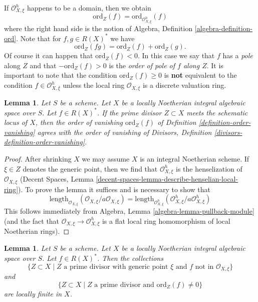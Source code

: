\documentclass{stacks-project}
\theoremstyle{plain}
\newtheorem{lemma}[subsection]{Lemma}
\theoremstyle{definition}
\theoremstyle{remark}
\numberwithin{equation}{subsection}
\begin{document}
\noindent
If $\mathcal{O}_{X, \xi}^h$ happens to be a domain, then we obtain
$$
\text{ord}_Z(f) = \text{ord}_{\mathcal{O}_{X, \xi}^h}(f)
$$
where the right hand side is the notion of
Algebra, Definition \ref{algebra-definition-ord}.
Note that for $f, g \in R(X)^*$ we have
$$
\text{ord}_Z(fg) = \text{ord}_Z(f) + \text{ord}_Z(g).
$$
Of course it can happen that $\text{ord}_Z(f) < 0$.
In this case we say that $f$ has a {\it pole} along $Z$
and that $-\text{ord}_Z(f) > 0$ is the
{\it order of pole of $f$ along $Z$}. It is important to note
that the condition $\text{ord}_Z(f) \geq 0$ is {\bf not} equivalent
to the condition $f \in \mathcal{O}_{X, \xi}^h$ unless the local
ring $\mathcal{O}_{X, \xi}$ is a discrete valuation ring.

\begin{lemma}
\label{lemma-order-vanishing-agrees}
Let $S$ be a scheme. Let $X$ be a locally Noetherian integral algebraic
space over $S$. Let $f \in R(X)^*$. If the prime divisor
$Z \subset X$ meets the schematic locus of $X$, then the order
of vanishing $\text{ord}_Z(f)$ of Definition \ref{definition-order-vanishing}
agrees with the order of vanishing of
Divisors, Definition \ref{divisors-definition-order-vanishing}.
\end{lemma}

\begin{proof}
After shrinking $X$ we may assume $X$ is an integral Noetherian scheme.
If $\xi \in Z$ denotes the generic point, then we find that
$\mathcal{O}_{X, \xi}^h$ is the henselization of $\mathcal{O}_{X, \xi}$
(Decent Spaces, Lemma \ref{decent-spaces-lemma-describe-henselian-local-ring}).
To prove the lemma it suffices and is necessary to show that
$$
\text{length}_{\mathcal{O}_{X, \xi}}
(\mathcal{O}_{X, \xi}/a \mathcal{O}_{X, \xi}) =
\text{length}_{\mathcal{O}_{X, \xi}^h}
(\mathcal{O}_{X, \xi}^h/a \mathcal{O}_{X, \xi}^h)
$$
This follows immediately from
Algebra, Lemma \ref{algebra-lemma-pullback-module}
(and the fact that $\mathcal{O}_{X, \xi} \to \mathcal{O}_{X, \xi}^h$
is a flat local ring homomorphism of local Noetherian rings).
\end{proof}

\begin{lemma}
\label{lemma-divisor-locally-finite}
Let $S$ be a scheme. Let $X$ be a locally Noetherian integral algebraic space
over $S$. Let $f \in R(X)^*$. Then the collections
$$
\{Z \subset X \mid Z\text{ a prime divisor with generic point }\xi
\text{ and }f\text{ not in }\mathcal{O}_{X, \xi}\}
$$
and
$$
\{Z \subset X \mid Z \text{ a prime divisor and }\text{ord}_Z(f) \not = 0\}
$$
are locally finite in $X$.
\end{lemma}
\end{document}
